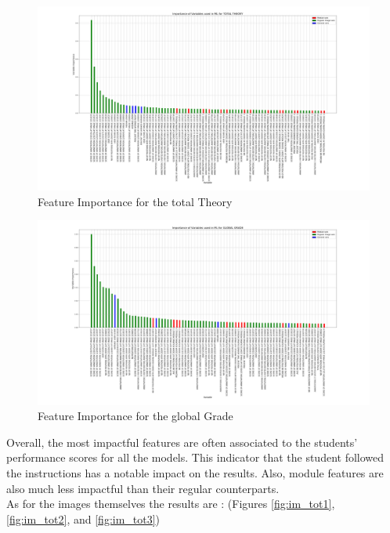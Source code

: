 \documentclass[a4paper,11pt]{report}
\numberwithin{figure}{section} %
\begin{document}
      \begin{figure}[H]
      \centering
      \includegraphics[width=.95\linewidth]{plots/var_importance_TOTAL_THEORY_2018-05-02_23_31_54.png}
      \caption{Feature Importance for the total Theory}
      \label{fig:var_tot2}
      \end{figure}

      \begin{figure}[H]
      \centering
      \includegraphics[width=.95\linewidth]{plots/var_importance_GLOBAL_GRADE_2018-05-02_20_56_11.png}
      \caption{Feature Importance for the global Grade}
      \label{fig:var_tot3}
      \end{figure}

    Overall, the most impactful features are often associated to the students' performance scores for all the models.
    This indicator that the student followed the instructions has a notable impact on the results.
    Also, module features are also much less impactful than their regular counterparts.\\

    As for the images themselves the results are : (Figures \ref{fig:im_tot1}, \ref{fig:im_tot2}, and \ref{fig:im_tot3})
\end{document}
